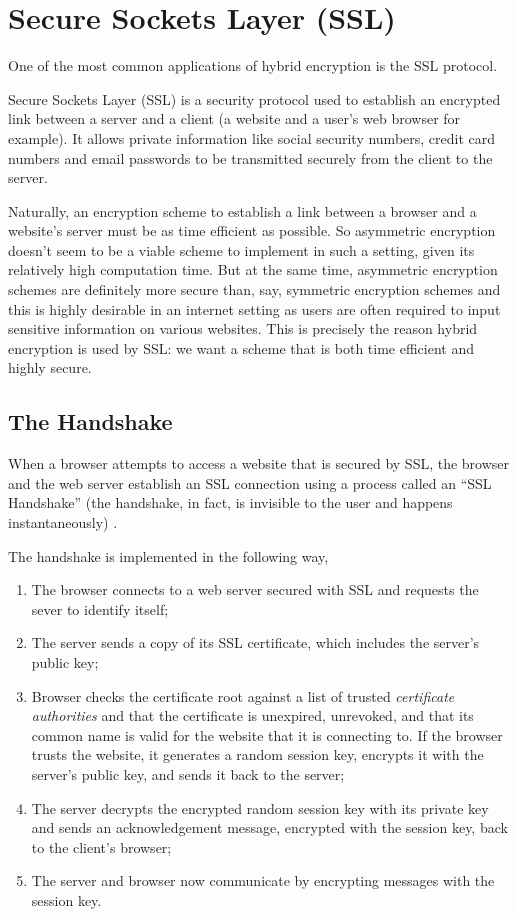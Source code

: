\section{Secure Sockets Layer (SSL)}

One of the most common applications of hybrid encryption is the SSL protocol.

Secure Sockets Layer (SSL) is a security protocol used to establish an encrypted link between a server and a client (a website and a user's web browser for example). It allows private information like social security numbers, credit card numbers and email passwords to be transmitted securely from the client to the server.

Naturally, an encryption scheme to establish a link between a browser and a website's server must be as time efficient as possible. So asymmetric encryption doesn't seem to be a viable scheme to implement in such a setting, given its relatively high computation time. But at the same time, asymmetric encryption schemes are definitely more secure than, say, symmetric encryption schemes and this is highly desirable in an internet setting as users are often required to input sensitive information on various websites. This is precisely the reason hybrid encryption is used by SSL: we want a scheme that is both time efficient and highly secure.

\subsection{The Handshake}

When a browser attempts to access a website that is secured by SSL, the browser and the web server establish an SSL connection using a process called an “SSL Handshake” (the handshake, in fact, is invisible to the user and happens instantaneously) \cite{digicert}.

The handshake is implemented in the following way,
\begin{enumerate}
\item The browser connects to a web server secured with SSL and requests the sever to identify itself;
\item The server sends a copy of its SSL certificate, which includes the server's public key;
\item Browser checks the certificate root against a list of trusted \textit{certificate authorities} and that the certificate is unexpired, unrevoked, and that its common name is valid for the website that it is connecting to. If the browser trusts the website, it generates a random session key, encrypts it with the server's public key, and sends it back to the server;
\item The server decrypts the encrypted random session key with its private key and sends an acknowledgement message, encrypted with the session key, back to the client's browser;
\item The server and browser now communicate by encrypting messages with the session key.
\end{enumerate}  %

\label{sec:ssl}
